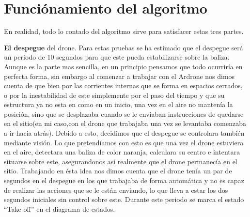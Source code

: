 \section{Funci\'onamiento del algoritmo}
\hspace{1cm} En realidad, todo lo contado del algoritmo sirve para satisfacer estas tres partes. 

\hspace{1cm} \textbf{El despegue} del drone. Para estas pruebas se ha estimado que el despegue ser\'a un periodo de 10 segundos para que este pueda estabilizarse sobre la baliza. Aunque es la parte mas sencilla, en un principio pensamos que todo ocurrir\'ia en perfecta forma, sin embargo al comenzar a trabajar con el Ardrone nos dimos cuenta de que bien por las corrientes internas que se forma en espacios cerrados, o por la inestabilidad de este simplemente por el paso del tiempo y que su estructura ya no esta en como en un inicio, una vez en el aire no manten\'ia la posici\'on, sino que se desplazaba cuando se le enviaban instrucciones de quedarse en el sitio(en mi caso,con el drone que trabajaba una vez se levantaba comenzaba a ir hacia atr\'as). Debido a esto, decidimos que el despegue se controlara tambi\'en mediante visi\'on. Lo que pretend\'iamos con esto es que una vez el drone estuviera en el aire, detectara una baliza de color naranja, calculara su centro e intentara situarse sobre este, asegurandonos as\'i realmente que el drone permanec\'ia en el sitio. Trabajando en \'esta idea nos dimos cuenta que el drone ten\'ia un par de segundos en el despegue en los que trabajaba de forma autom\'atica y no es capaz de realizar las acciones que se le est\'an enviando, lo que lleva a estar los dos segundos iniciales sin control sobre este. Durante este periodo se marca el estado "`Take off"' en el diagrama de estados.

